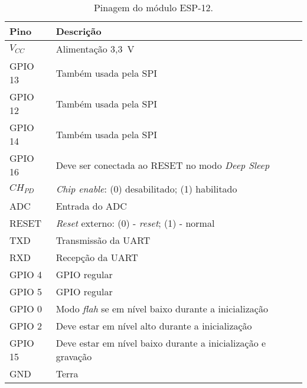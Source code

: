 \begin{table}[H]
    \centering
    \caption[Pinagem do módulo ESP-12]{Pinagem do módulo ESP-12.
    \label{tab:pinoutesp}}
\begin{tabular}{|l|l|}
\hline
\textbf{Pino} & \textbf{Descrição} \\ \hline
$V_{CC}$ & Alimentação 3,3\ V \\ \hline
GPIO 13 & Também usada pela SPI \\ \hline
GPIO 12 & Também usada pela SPI \\ \hline
GPIO 14 & Também usada pela SPI \\ \hline
GPIO 16 & Deve ser conectada ao RESET no modo \emph{Deep Sleep} \\ \hline
$CH_{PD}$ & \emph{Chip enable}: (0) desabilitado; (1) habilitado \\ \hline
ADC & Entrada do ADC \\ \hline
RESET & \emph{Reset} externo: (0) - \emph{reset}; (1) - normal \\ \hline
TXD & Transmissão da UART \\ \hline
RXD & Recepção da UART \\ \hline
GPIO 4 & GPIO regular \\ \hline
GPIO 5 & GPIO regular \\ \hline
GPIO 0 & Modo \emph{flah} se em nível baixo durante a inicialização \\ \hline
GPIO 2 & Deve estar em nível alto durante a inicialização \\ \hline
GPIO 15 & Deve estar em nível baixo durante a inicialização e gravação \\ \hline
GND & Terra \\ \hline
\end{tabular}
\end{table}
